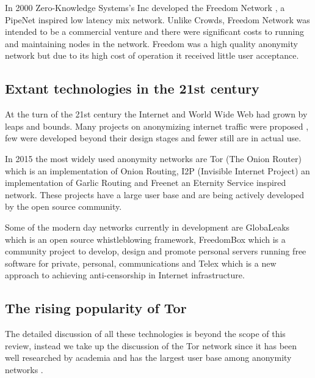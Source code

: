 \documentclass{llncs}
\begin{document}
In 2000 Zero-Knowledge Systems's Inc developed the Freedom Network \cite{freedom2-arch}, a PipeNet inspired low latency mix network. Unlike Crowds, Freedom Network was intended to be a commercial venture and there were significant costs to running and maintaining nodes in the network. Freedom was a high quality anonymity network but due to its high cost of operation it received little user acceptance.

\subsection{Extant technologies in the 21st century} \label{new_proj}

At the turn of the 21st century the Internet and World Wide Web had grown by leaps and bounds. Many projects on anonymizing internet traffic were proposed \cite{goldberg97privacyenhancing} \cite{fiveyearslater}, few were developed beyond their design stages and fewer still are in actual use.

In 2015 the most widely used anonymity networks are Tor (The Onion Router) \cite{tor-design} which is an implementation of Onion Routing, I2P (Invisible Internet Project) \cite{jrandom2003,zantout2011} an implementation of Garlic Routing and Freenet \cite{freenet} an Eternity Service inspired network. These projects have a large user base and are being actively developed by the open source community.

Some of the modern day networks currently in development are GlobaLeaks \cite{globaleaks} which is an open source whistleblowing framework, FreedomBox \cite{freedom-box} which is a community project to develop, design and promote personal servers running free software for private, personal, communications and Telex \cite{telex11} which is a new approach to achieving anti-censorship in Internet infrastructure. 

\subsection{The rising popularity of Tor}
The detailed discussion of all these technologies is beyond the scope of this review, instead we take up the discussion of the Tor network since it has been well researched by academia and has the largest user base among anonymity networks \cite{tor-metrics}.
\end{document}

